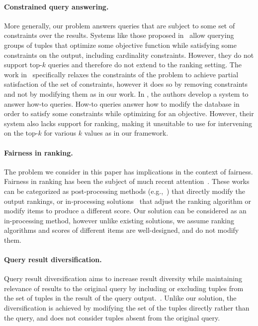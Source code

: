 \paragraph*{\textbf{Constrained query answering.}} More generally, our problem answers queries that are subject to some set of constraints over the results. Systems like those proposed in~\cite{BRAM15,BAM14} allow querying groups of tuples that optimize some objective function while satisfying some constraints on the output, including cardinality constraints. However, they do not support top-$k$ queries and therefore do not extend to the ranking setting. The work in~\cite{BAM14} specifically relaxes the constraints of the problem to achieve partial satisfaction of the set of constraints, however it does so by removing constraints and not by modifying them as in our work. In \cite{Tiresias}, the authors develop a system to answer how-to queries. How-to queries answer how to modify the database in order to satisfy some constraints while optimizing for an objective. However, their system also lacks support for ranking, making it unsuitable to use for intervening on the top-$k$ for various $k$ values as in our framework.





\paragraph*{\textbf{Fairness in ranking.}} The problem we consider in this paper has implications in the context of fairness. Fairness in ranking has been the subject of much recent attention~\cite{ZYS23, ZYS23b, YGS19,CSV18, AJS19, IWSR22, CMR23, YS17, KR18, CMV20}. These works can be categorized as post-processing methods (e.g.,~\cite{YS17, YGS19,CSV18}) that directly modify the output rankings, or in-processing solutions~\cite{AJS19, IWSR22, CMR23, KR18, CMV20} that adjust the ranking algorithm or modify items to produce a different score. Our solution can be considered as an in-processing method, however unlike existing solutions, we assume ranking algorithms and scores of different items are well-designed, and do not modify them.






  
\paragraph*{\textbf{Query result diversification.}}
Query result diversification aims to increase result diversity while maintaining relevance of results to the original query by including or excluding tuples from the set of tuples in the result of the query output.~\cite{GS09,VRB+11,DF14}. Unlike our solution, the diversification is achieved by modifying the set of the tuples directly rather than the query, and does not consider tuples absent from the original query.



